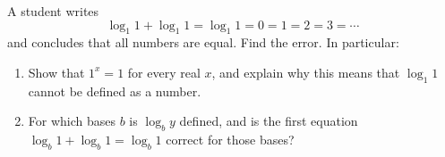 A student writes
\[\log_1 1+\log_1 1=\log_1 1=0=1=2=3=\cdots\]
and concludes that all numbers are equal. Find the error. In particular:
\begin{enumerate}
\item[(a)] Show that $1^x=1$ for every real $x$, and explain why this means that $\log_1 1$ cannot be defined as a number.
\item[(b)] For which bases $b$ is $\log_b y$ defined, and is the first equation $\log_b1+\log_b1=\log_b1$ correct for those bases?
\end{enumerate}
